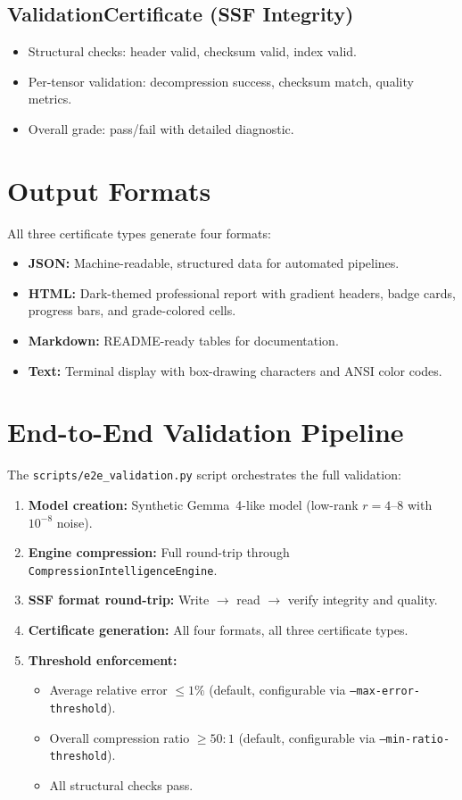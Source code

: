 \documentclass[11pt,a4paper,openright]{book}
\begin{document}
\subsection{ValidationCertificate (SSF Integrity)}

\begin{itemize}
	\item Structural checks: header valid, checksum valid, index valid.
	\item Per-tensor validation: decompression success, checksum match, quality metrics.
	\item Overall grade: pass/fail with detailed diagnostic.
\end{itemize}

\section{Output Formats}

All three certificate types generate four formats:
\begin{itemize}
	\item \textbf{JSON:} Machine-readable, structured data for automated pipelines.
	\item \textbf{HTML:} Dark-themed professional report with gradient headers, badge cards, progress bars, and grade-colored cells.
	\item \textbf{Markdown:} README-ready tables for documentation.
	\item \textbf{Text:} Terminal display with box-drawing characters and ANSI color codes.
\end{itemize}

\section{End-to-End Validation Pipeline}

The \texttt{scripts/e2e\_validation.py} script orchestrates the full validation:

\begin{enumerate}
	\item \textbf{Model creation:} Synthetic Gemma~4-like model (low-rank $r=4$--$8$ with $10^{-8}$ noise).
	\item \textbf{Engine compression:} Full round-trip through \texttt{CompressionIntelligenceEngine}.
	\item \textbf{SSF format round-trip:} Write $\to$ read $\to$ verify integrity and quality.
	\item \textbf{Certificate generation:} All four formats, all three certificate types.
	\item \textbf{Threshold enforcement:}
	      \begin{itemize}
		      \item Average relative error $\le 1\%$ (default, configurable via \texttt{--max-error-threshold}).
		      \item Overall compression ratio $\ge 50:1$ (default, configurable via \texttt{--min-ratio-threshold}).
		      \item All structural checks pass.
	      \end{itemize}
\end{enumerate}
\end{document}
